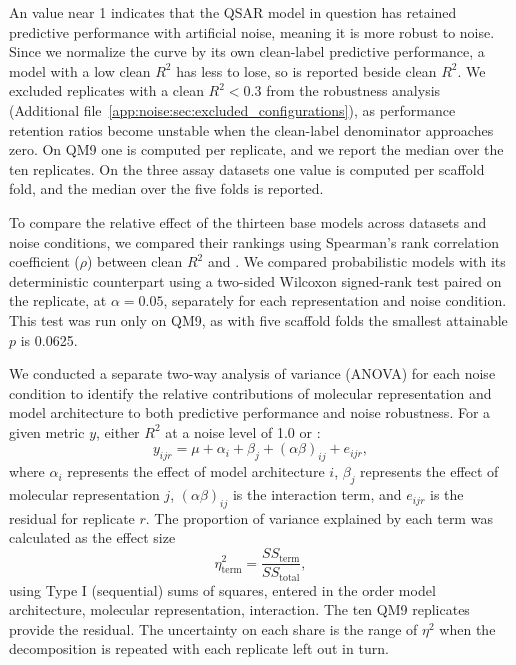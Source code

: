 An \aucnorm value near 1 indicates that the QSAR model in question has retained predictive performance with artificial noise, meaning it is more robust to noise. Since we normalize the curve by its own clean-label predictive performance, a model with a low clean $R^2$ has less to lose, so \aucnorm is reported beside clean $R^2$. We excluded replicates with a clean $R^2 < 0.3$ from the robustness analysis (Additional file~\ref{app:noise:sec:excluded_configurations}), as performance retention ratios become unstable when the clean-label denominator approaches zero. On QM9 one \aucnorm is computed per replicate, and we report the median over the ten replicates. On the three assay datasets one value is computed per scaffold fold, and the median over the five folds is reported. 

To compare the relative effect of the thirteen base models across datasets and noise conditions, we compared their rankings using Spearman's rank correlation coefficient ($\rho$) between clean $R^2$ and \aucnorm. We compared probabilistic models  with its deterministic counterpart using a two-sided Wilcoxon signed-rank test paired on the replicate, at $\alpha = 0.05$, separately for each representation and noise condition. This test was run only on QM9, as with five scaffold folds the
smallest attainable $p$ is 0.0625.

We conducted a separate two-way analysis of variance (ANOVA) for each noise condition to identify the
relative contributions of molecular representation and model architecture to both predictive
performance and noise robustness. For a given metric $y$, either $R^2$ at a noise level of 1.0 or
\aucnorm:
\begin{equation}
y_{ijr} = \mu + \alpha_i + \beta_j + (\alpha\beta)_{ij} + e_{ijr},
\end{equation}
where $\alpha_i$ represents the effect of model architecture $i$, $\beta_j$ represents the effect of
molecular representation $j$, $(\alpha\beta)_{ij}$ is the interaction term, and $e_{ijr}$ is the
residual for replicate $r$. The proportion of variance explained by each term was calculated as the
effect size
\begin{equation}
\eta^2_{\text{term}} = \frac{SS_{\text{term}}}{SS_{\text{total}}},
\end{equation}
using Type I (sequential) sums of squares, entered in the order model architecture, molecular
representation, interaction. The ten QM9 replicates provide the residual. The uncertainty on each share is the range of $\eta^2$ when the decomposition is repeated with each replicate left out in turn. 

